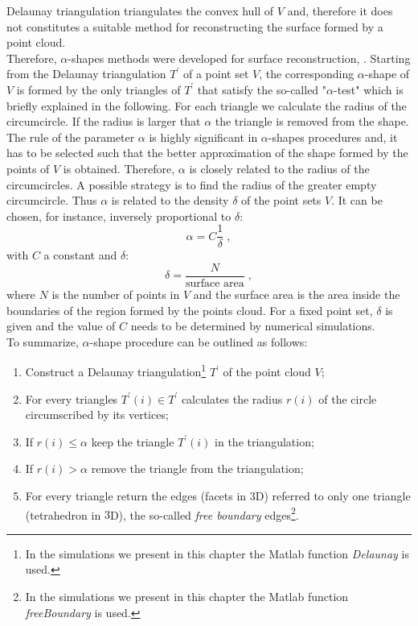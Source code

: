 Delaunay triangulation triangulates the convex hull of $V$ and, therefore it does not constitutes a suitable method for reconstructing the surface formed by a point cloud. 
\\ \indent Therefore, $\alpha$-shapes methods were developed for surface reconstruction, \cite{edelsbrunner2010alpha, guo1997surface}. Starting from the Delaunay triangulation $T^\prime$ of a point set $V$, the corresponding $\alpha$-shape of $V$ is formed by the only triangles of $T^\prime$ that satisfy the so-called "$\alpha$-test" which is briefly explained in the following.
For each triangle we calculate the radius of the circumcircle. If the radius is larger that $\alpha$ the triangle is removed from the shape. The rule of the parameter $\alpha$ is highly significant in $\alpha$-shapes procedures and, it has to be selected such that the better approximation of the shape formed by the points of $V$ is obtained. 
Therefore, $\alpha$ is closely related to the radius of the circumcircles. A possible strategy is to find the radius of the greater empty circumcircle. Thus $\alpha$ is related to the density $\delta$ of the point sets $V$. It can be chosen, for instance, inversely proportional to $\delta$:
\begin{equation}
\alpha=C\frac{1}{\delta}\;,
\end{equation}
with $C$ a constant and $\delta$:
\begin{equation}
\delta=\frac{N}{\mbox{surface area}}\; ,
\end{equation}
where $N$ is the number of points in $V$ and the surface area is the area inside the boundaries of the region formed by the points cloud. 
For a fixed point set, $\delta$ is given and the value of $C$ needs to be determined by numerical simulations.\\ \indent 
To summarize, $\alpha$-shape procedure can be outlined as follows:
\begin{enumerate}
\item Construct a Delaunay triangulation\footnote{In the simulations we present in this chapter the Matlab function \textit{Delaunay} is used.} $T^\prime$ of the point cloud $V$;
\item For every triangles $T^\prime(i)\in T^\prime$ calculates the radius $r(i)$ of the circle circumscribed by its vertices;
\item If $r(i)\leq\alpha$ keep the triangle $T^\prime(i)$ in the triangulation;
\item If $r(i)>\alpha$ remove the triangle from the triangulation;
\item For every triangle return the edges (facets in $3$D) referred to only one triangle (tetrahedron in $3$D), the so-called \textit{free boundary} edges\footnote{In the simulations we present in this chapter the Matlab function \textit{freeBoundary} is used.}.
\end{enumerate}
